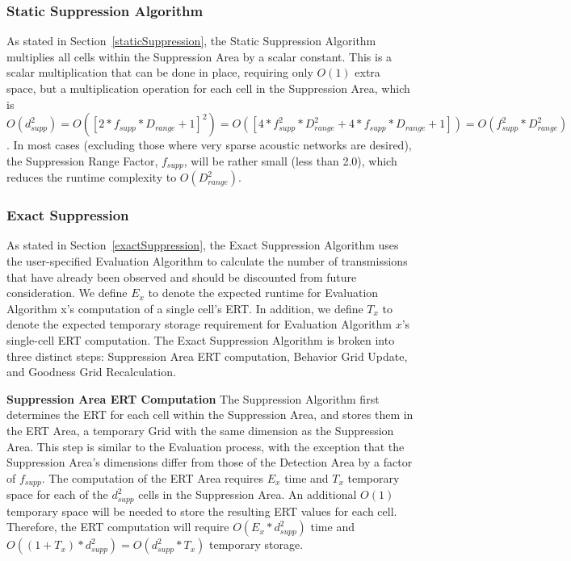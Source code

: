 \subsubsection{Static Suppression Algorithm}
As stated in Section~\ref{staticSuppression}, the Static Suppression Algorithm multiplies all cells within the Suppression Area by a scalar constant.  This is a scalar multiplication that can be done in place, requiring only $O(1)$ extra space, but a multiplication operation for each cell in the Suppression Area, which is $O(d_{supp} ^2) = O([2*f_{supp}*D_{range} + 1]^2) = O([4*f_{supp}^2*D_{range}^2 + 4*f_{supp}*D_{range} + 1]) = O(f_{supp}^2*D_{range}^2)$.  In most cases (excluding those where very sparse acoustic networks are desired), the Suppression Range Factor, $f_{supp}$, will be rather small (less than 2.0), which reduces the runtime complexity to $O(D_{range}^2)$.

\subsubsection{Exact Suppression}
As stated in Section~\ref{exactSuppression}, the Exact Suppression Algorithm uses the user-specified Evaluation Algorithm to calculate the number of transmissions that have already been observed and should be discounted from future consideration.  We define $E_{x}$ to denote the expected runtime for Evaluation Algorithm x's computation of a single cell's ERT.  In addition, we define $T_{x}$ to denote the expected temporary storage requirement for Evaluation Algorithm $x$'s single-cell ERT computation.  The Exact Suppression Algorithm is broken into three distinct steps: Suppression Area ERT computation, Behavior Grid Update, and Goodness Grid Recalculation.
\newline

\textbf{Suppression Area ERT Computation}\newline
The Suppression Algorithm first determines the ERT for each cell within the Suppression Area, and stores them in the ERT Area, a temporary Grid with the same dimension as the Suppression Area.  This step is similar to the Evaluation process, with the exception that the Suppression Area's dimensions differ from those of the Detection Area by a factor of $f_{supp}$.  The computation of the ERT Area requires $E_{x}$ time and  $T_x$ temporary space for each of the $d_{supp}^2$ cells in the Suppression Area.  An additional  $O(1)$ temporary space will be needed to store the resulting ERT values for each cell.  Therefore, the ERT computation will require $O(E_{x} * d_{supp}^2)$ time and $O((1 + T_x)* d_{supp}^2) = O(d_{supp}^2 * T_x)$ temporary storage.

